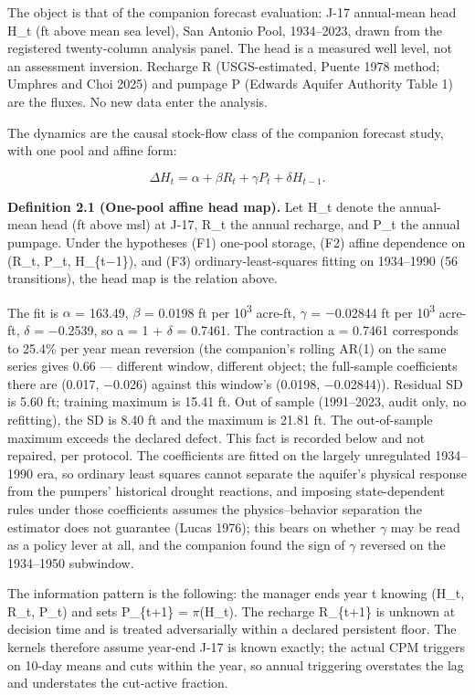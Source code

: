 \documentclass[11pt]{article}
\begin{document}
The object is that of the companion forecast evaluation: J-17
annual-mean head H\_t (ft above mean sea level), San Antonio Pool,
1934--2023, drawn from the registered twenty-column analysis panel. The
head is a measured well level, not an assessment inversion. Recharge R
(USGS-estimated, Puente 1978 method; Umphres and Choi 2025) and pumpage
P (Edwards Aquifer Authority Table 1) are the fluxes. No new data enter
the analysis.

The dynamics are the causal stock-flow class of the companion forecast
study, with one pool and affine form:

\[\Delta H_t = \alpha + \beta R_t + \gamma P_t + \delta H_{t-1}.\]

\textbf{Definition 2.1 (One-pool affine head map).} Let H\_t denote the
annual-mean head (ft above msl) at J-17, R\_t the annual recharge, and
P\_t the annual pumpage. Under the hypotheses (F1) one-pool storage,
(F2) affine dependence on (R\_t, P\_t, H\_\{t\ensuremath{-}1\}), and (F3)
ordinary-least-squares fitting on 1934--1990 (56 transitions), the head
map is the relation above.

The fit is \ensuremath{\alpha} = 163.49, \ensuremath{\beta} = 0.0198 ft per 10\textsuperscript{3} acre-ft, \ensuremath{\gamma} = \ensuremath{-}0.02844 ft
per 10\textsuperscript{3} acre-ft, \ensuremath{\delta} = \ensuremath{-}0.2539, so a = 1 + \ensuremath{\delta} = 0.7461. The contraction a =
0.7461 corresponds to 25.4\% per year mean reversion (the companion's
rolling AR(1) on the same series gives 0.66 --- different window,
different object; the full-sample coefficients there are (0.017, \ensuremath{-}0.026)
against this window's (0.0198, \ensuremath{-}0.02844)). Residual SD is 5.60 ft;
training maximum is 15.41 ft. Out of sample (1991--2023, audit only, no
refitting), the SD is 8.40 ft and the maximum is 21.81 ft. The
out-of-sample maximum exceeds the declared defect. This fact is recorded
below and not repaired, per protocol. The coefficients are fitted on the
largely unregulated 1934--1990 era, so ordinary least squares cannot
separate the aquifer's physical response from the pumpers' historical
drought reactions, and imposing state-dependent rules under those
coefficients assumes the physics--behavior separation the estimator does
not guarantee (Lucas 1976); this bears on whether \ensuremath{\gamma} may be read as a
policy lever at all, and the companion found the sign of \ensuremath{\gamma} reversed on
the 1934--1950 subwindow.

The information pattern is the following: the manager ends year t
knowing (H\_t, R\_t, P\_t) and sets P\_\{t+1\} = \ensuremath{\pi}(H\_t). The recharge
R\_\{t+1\} is unknown at decision time and is treated adversarially
within a declared persistent floor. The kernels therefore assume
year-end J-17 is known exactly; the actual CPM triggers on 10-day means
and cuts within the year, so annual triggering overstates the lag and
understates the cut-active fraction.
\end{document}
